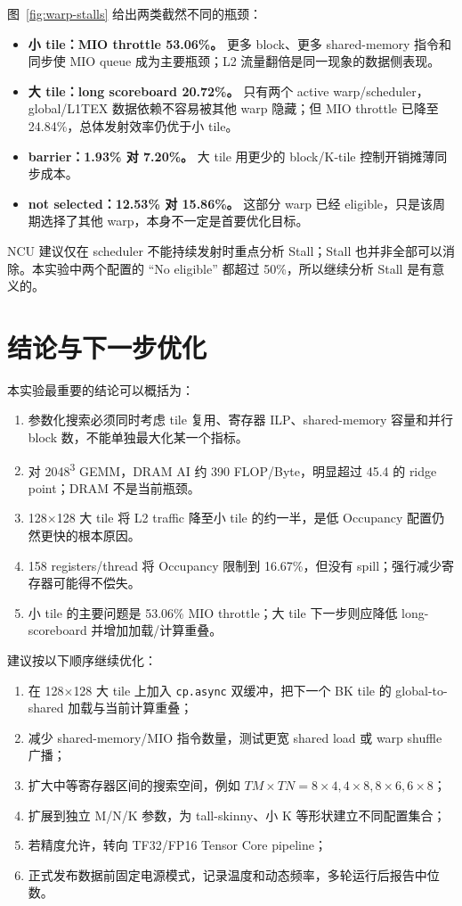 \documentclass[UTF8,11pt,a4paper,fontset=fandol]{ctexart}
\newcommand{\code}[1]{\nolinkurl{#1}}
\begin{document}
图~\ref{fig:warp-stalls} 给出两类截然不同的瓶颈：

\begin{itemize}
  \item \textbf{小 tile：MIO throttle 53.06\%。} 更多 block、更多 shared-memory 指令和同步使 MIO queue 成为主要瓶颈；L2 流量翻倍是同一现象的数据侧表现。
  \item \textbf{大 tile：long scoreboard 20.72\%。} 只有两个 active warp/scheduler，global/L1TEX 数据依赖不容易被其他 warp 隐藏；但 MIO throttle 已降至 24.84\%，总体发射效率仍优于小 tile。
  \item \textbf{barrier：1.93\% 对 7.20\%。} 大 tile 用更少的 block/K-tile 控制开销摊薄同步成本。
  \item \textbf{not selected：12.53\% 对 15.86\%。} 这部分 warp 已经 eligible，只是该周期选择了其他 warp，本身不一定是首要优化目标。
\end{itemize}

NCU 建议仅在 scheduler 不能持续发射时重点分析 Stall；Stall 也并非全部可以消除\cite{ncu-warp-state}。本实验中两个配置的 ``No eligible'' 都超过 50\%，所以继续分析 Stall 是有意义的。

\section{结论与下一步优化}

本实验最重要的结论可以概括为：

\begin{enumerate}
  \item 参数化搜索必须同时考虑 tile 复用、寄存器 ILP、shared-memory 容量和并行 block 数，不能单独最大化某一个指标。
  \item 对 2048\textsuperscript{3} GEMM，DRAM AI 约 390 FLOP/Byte，明显超过 45.4 的 ridge point；DRAM 不是当前瓶颈。
  \item 128$\times$128 大 tile 将 L2 traffic 降至小 tile 的约一半，是低 Occupancy 配置仍然更快的根本原因。
  \item 158 registers/thread 将 Occupancy 限制到 16.67\%，但没有 spill；强行减少寄存器可能得不偿失。
  \item 小 tile 的主要问题是 53.06\% MIO throttle；大 tile 下一步则应降低 long-scoreboard 并增加加载/计算重叠。
\end{enumerate}

建议按以下顺序继续优化：

\begin{enumerate}
  \item 在 128$\times$128 大 tile 上加入 \code{cp.async} 双缓冲，把下一个 BK tile 的 global-to-shared 加载与当前计算重叠；
  \item 减少 shared-memory/MIO 指令数量，测试更宽 shared load 或 warp shuffle 广播；
  \item 扩大中等寄存器区间的搜索空间，例如 $TM\times TN=8\times4,4\times8,8\times6,6\times8$；
  \item 扩展到独立 M/N/K 参数，为 tall-skinny、小 K 等形状建立不同配置集合；
  \item 若精度允许，转向 TF32/FP16 Tensor Core pipeline；
  \item 正式发布数据前固定电源模式，记录温度和动态频率，多轮运行后报告中位数。
\end{enumerate}
\end{document}

